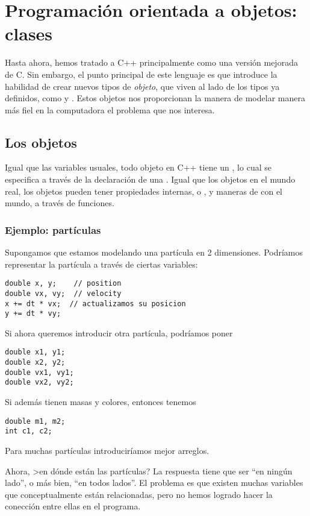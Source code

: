 \chapter{Programación orientada a objetos: clases}

Hasta ahora, hemos tratado a C++ principalmente como una versión mejorada de C.
Sin embargo, el punto principal de este lenguaje es que introduce la habilidad de crear nuevos tipos de \emph{objeto}, que viven al lado de los tipos ya definidos, como  y . Estos objetos nos proporcionan la manera de modelar manera más fiel en la computadora el problema que nos interesa.

\section{Los objetos}

Igual que las variables usuales, todo objeto en C++ tiene un , lo cual se especifica a través de la declaración de una .
Igual que los objetos en el mundo real, los objetos pueden tener propiedades internas, o , y maneras de  con el mundo, a través de funciones.

\subsection{Ejemplo: partículas}

Supongamos que estamos modelando una partícula en 2 dimensiones.
Podríamos representar la partícula a través de ciertas variables:
\begin{lstlisting}
double x, y;    // position
double vx, vy;  // velocity
x += dt * vx;  // actualizamos su posicion
y += dt * vy;
\end{lstlisting}

Si ahora queremos introducir otra partícula, podríamos poner
\begin{lstlisting}
double x1, y1;
double x2, y2;
double vx1, vy1;
double vx2, vy2;
\end{lstlisting}
Si además tienen masas y colores, entonces tenemos
\begin{lstlisting}
double m1, m2;
int c1, c2; 
\end{lstlisting}
Para muchas partículas introduciríamos mejor arreglos. 

Ahora, >en dónde están las partículas? La respuesta tiene que ser ``en ningún lado'', o más bien, ``en todos lados''.
El problema es que existen muchas variables que conceptualmente están relacionadas, pero no hemos logrado hacer la conección entre ellas en el programa.

